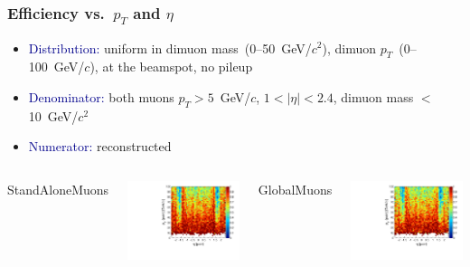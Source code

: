 \documentclass[compress]{beamer}
\begin{document}
\begin{frame}
\frametitle{Efficiency vs.\ $p_T$ and $\eta$}
\begin{itemize}
\item \textcolor{darkblue}{Distribution:} uniform in dimuon mass~(0--50~GeV/$c^2$), dimuon $p_T$~(0--100~GeV/$c$), at the beamspot, no pileup

\item \textcolor{darkblue}{Denominator:} both muons $p_T > 5$~GeV/$c$, $1 < |\eta| < 2.4$, dimuon mass $<$ 10~GeV/$c^2$

\item \textcolor{darkblue}{Numerator:} reconstructed
\end{itemize}

\vfill
\begin{columns}
\centering StandAloneMuons

\includegraphics[width=\linewidth]{pteta_mass10cut_StandAloneMuon.pdf}

\centering GlobalMuons

\includegraphics[width=\linewidth]{pteta_mass10cut_GlobalMuon.pdf}


\end{columns}
\end{frame}
\end{document}
